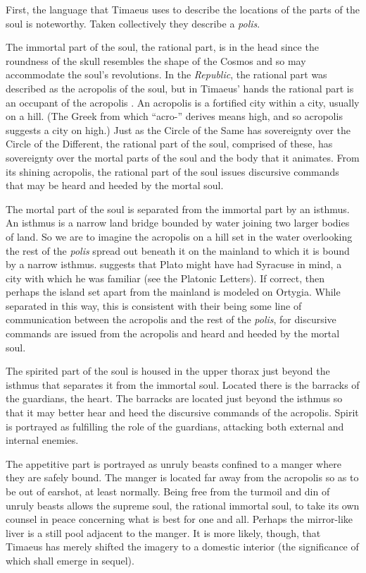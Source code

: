 First, the language that Timaeus uses to describe the locations of the parts of the soul is noteworthy. Taken collectively they describe a \emph{polis}. 

The immortal part of the soul, the rational part, is in the head since the roundness of the skull resembles the shape of the Cosmos and so may accommodate the soul's revolutions. In the \emph{Republic}, the rational part was described as the acropolis of the soul, but in Timaeus' hands the rational part is an occupant of the acropolis \citep[81]{Price:1995hc}. An acropolis is a fortified city within a city, usually on a hill. (The Greek from which ``acro-'' derives means high, and so acropolis suggests a city on high.) Just as the Circle of the Same has sovereignty over the Circle of the Different, the rational part of the soul, comprised of these, has sovereignty over the mortal parts of the soul and the body that it animates. From its shining acropolis, the rational part of the soul issues discursive commands that may be heard and heeded by the mortal soul.

The mortal part of the soul is separated from the immortal part by an isthmus. An isthmus is a narrow land bridge bounded by water joining two larger bodies of land. So we are to imagine the acropolis on a hill set in the water overlooking the rest of the \emph{polis} spread out beneath it on the mainland to which it is bound by a narrow isthmus. \citet[500]{Taylor:1928qb} suggests that Plato might have had Syracuse in mind, a city with which he was familiar (see the Platonic Letters). If correct, then perhaps the island set apart from the mainland is modeled on Ortygia. While separated in this way, this is consistent with their being some line of communication between the acropolis and the rest of the \emph{polis}, for discursive commands are issued from the acropolis and heard and heeded by the mortal soul. 

The spirited part of the soul is housed in the upper thorax just beyond the isthmus that separates it from the immortal soul. Located there is the barracks of the guardians, the heart. The barracks are located just beyond the isthmus so that it may better hear and heed the discursive commands of the acropolis. Spirit is portrayed as fulfilling the role of the guardians, attacking both external and internal enemies.

The appetitive part is portrayed as unruly beasts confined to a manger where they are safely bound. The manger is located far away from the acropolis so as to be out of earshot, at least normally. Being free from the turmoil and din of unruly beasts allows the supreme soul, the rational immortal soul, to take its own counsel in peace concerning what is best for one and all. Perhaps the mirror-like liver is a still pool adjacent to the manger. It is more likely, though, that Timaeus has merely shifted the imagery to a domestic interior (the significance of which shall emerge in sequel).

